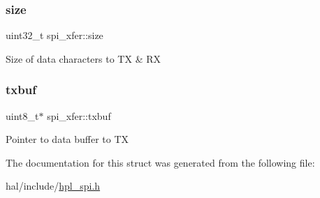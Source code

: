 \subsubsection{\texorpdfstring{size}{size}}
{\footnotesize\ttfamily uint32\+\_\+t spi\+\_\+xfer\+::size}

Size of data characters to TX \& RX \mbox{\label{structspi__xfer_a926e5eb02b0e309311d98b6c43e3e7ac}} 
\subsubsection{\texorpdfstring{txbuf}{txbuf}}
{\footnotesize\ttfamily uint8\+\_\+t$\ast$ spi\+\_\+xfer\+::txbuf}

Pointer to data buffer to TX 

The documentation for this struct was generated from the following file\+:\begin{DoxyCompactItemize}
\item 
hal/include/\hyperlink{hpl__spi_8h}{hpl\+\_\+spi.\+h}\end{DoxyCompactItemize}
